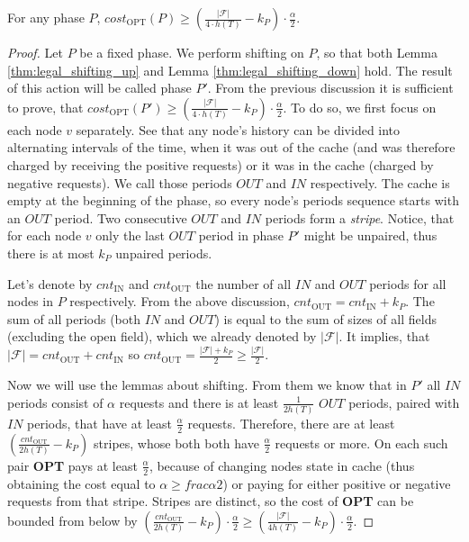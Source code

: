 \begin{lemma} For any phase $P$, $cost_{\mathrm{OPT}}(P) \geq
(\frac{|\mathcal{F}|}{4 \cdot h(T)} -k_P) \cdot \frac{\alpha}{2}$.
\label{thm:opt_bound_with_F} \end{lemma} \begin{proof} Let $P$ be a fixed phase.
We perform shifting on $P$, so that both Lemma \ref{thm:legal_shifting_up} and
Lemma \ref{thm:legal_shifting_down} hold. The result of this action will be
called phase $P'$. From the previous discussion it is sufficient to prove, that
$cost_{\mathrm{OPT}}(P') \geq (\frac{|\mathcal{F}|}{4 \cdot h(T)}-k_P) \cdot
\frac{\alpha}{2}$. To do so, we first focus on each node $v$ separately. See
that any node's history can be divided into alternating intervals of the time,
when it was out of the cache (and was therefore charged by receiving the
positive requests) or it was in the cache (charged by negative requests). We
call those periods $OUT$ and $IN$ respectively. The cache is empty at the
beginning of the phase, so every node's periods sequence starts with an $OUT$
period. Two consecutive $OUT$ and $IN$ periods form a \textit{stripe}. Notice,
that for each node $v$ only the last $OUT$ period in phase $P'$ might be
unpaired, thus there is at most $k_P$ unpaired periods.

Let's denote by $cnt_{\mathrm{IN}}$ and $cnt_{\mathrm{OUT}}$ the number of all
$IN$ and $OUT$ periods for all nodes in $P$  respectively. From the above
discussion, $cnt_{\mathrm{OUT}} = cnt_{\mathrm{IN}} + k_P$. The sum of all
periods (both $IN$ and $OUT$) is equal to the sum of sizes of all fields
(excluding the open field), which we already denoted by $|\mathcal{F}|$. It
implies, that $|\mathcal{F}| = cnt_{\mathrm{OUT}} + cnt_{\mathrm{IN}}$ so
$cnt_{\mathrm{OUT}} = \frac{|\mathcal{F}| + k_P}{2} \geq
\frac{|\mathcal{F}|}{2}.$

Now we will use the lemmas about shifting. From them we know that in $P'$ all
$IN$ periods consist of $\alpha$ requests and there is at least
$\frac{1}{2h(T)}$ $OUT$ periods, paired with $IN$ periods, that have at least
$\frac{\alpha}{2}$ requests. Therefore, there are at least
$(\frac{cnt_{\mathrm{OUT}}}{2h(T)} - k_P)$ stripes, whose both both have
$\frac{\alpha}{2}$ requests or more. On each such pair \textbf{OPT} pays at
least $\frac{\alpha}{2}$, because of changing nodes state in cache (thus
obtaining the cost equal to $\alpha \geq frac{\alpha}{2}$) or paying for either
positive or negative requests from that stripe.  Stripes are distinct, so the
cost of \textbf{OPT} can be bounded from below by
$(\frac{cnt_{\mathrm{OUT}}}{2h(T)} - k_P) \cdot \frac{\alpha}{2} \geq
(\frac{|\mathcal{F}|}{4h(T)} - k_P) \cdot  \frac{\alpha}{2}$.  \end{proof}

